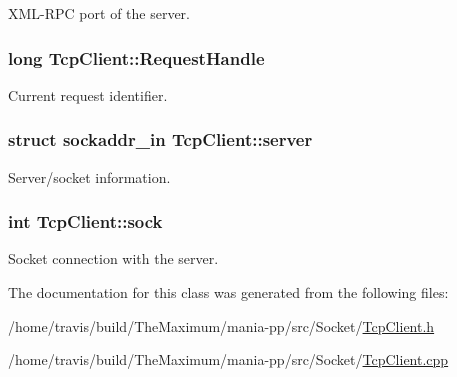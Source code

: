 X\-M\-L-\/\-R\-P\-C port of the server. 

\hypertarget{classTcpClient_a57ffabce89de6e0f07a3717758f67fe6}{
\subsubsection[{Request\-Handle}]{\setlength{\rightskip}{0pt plus 5cm}long Tcp\-Client\-::\-Request\-Handle}}\label{classTcpClient_a57ffabce89de6e0f07a3717758f67fe6}


Current request identifier. 

\hypertarget{classTcpClient_a75a8bd28eca3f1eea17fb430ab14cade}{
\subsubsection[{server}]{\setlength{\rightskip}{0pt plus 5cm}struct sockaddr\-\_\-in Tcp\-Client\-::server\hspace{0.3cm}{\ttfamily [private]}}}\label{classTcpClient_a75a8bd28eca3f1eea17fb430ab14cade}


Server/socket information. 

\hypertarget{classTcpClient_af93f7c8c4d91d93379ba99fd3742c3dc}{
\subsubsection[{sock}]{\setlength{\rightskip}{0pt plus 5cm}int Tcp\-Client\-::sock\hspace{0.3cm}{\ttfamily [private]}}}\label{classTcpClient_af93f7c8c4d91d93379ba99fd3742c3dc}


Socket connection with the server. 



The documentation for this class was generated from the following files\-:\begin{DoxyCompactItemize}
\item 
/home/travis/build/\-The\-Maximum/mania-\/pp/src/\-Socket/\hyperlink{TcpClient_8h}{Tcp\-Client.\-h}\item 
/home/travis/build/\-The\-Maximum/mania-\/pp/src/\-Socket/\hyperlink{TcpClient_8cpp}{Tcp\-Client.\-cpp}\end{DoxyCompactItemize}
